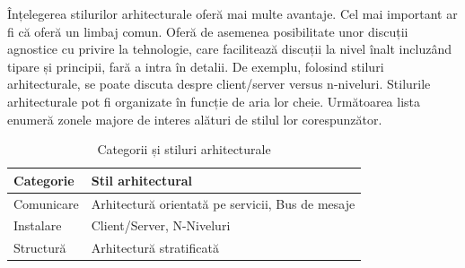 \documentclass[12pt, a4paper, oneside, romanian]{teza-upb}
\begin{document}
Înțelegerea stilurilor arhitecturale oferă mai multe avantaje. Cel mai important ar fi că oferă un limbaj comun. Oferă de asemenea posibilitate unor discuții agnostice cu privire la tehnologie, care facilitează discuții la nivel înalt incluzând tipare și principii, fară a intra în detalii. De exemplu, folosind stiluri arhitecturale, se poate discuta despre client/server versus n-niveluri. Stilurile arhitecturale pot fi organizate în funcție de aria lor cheie. Următoarea lista enumeră zonele majore de interes alături de stilul lor corespunzător.
\begin{table}[ht]
\centering
    \begin{tabular}{| p{3cm} | p{10cm} |}
    \hline
    Categorie & Stil arhitectural \\ \hline
    Comunicare & Arhitectură orientată pe servicii, Bus de mesaje\\ \hline
    Instalare & Client/Server, N-Niveluri \\ \hline
    Structură & Arhitectură stratificată \\ \hline
    \end{tabular}
    \label{altebasme}
\caption{Categorii și stiluri arhitecturale}
\end{table}

\newpage
\end{document}
